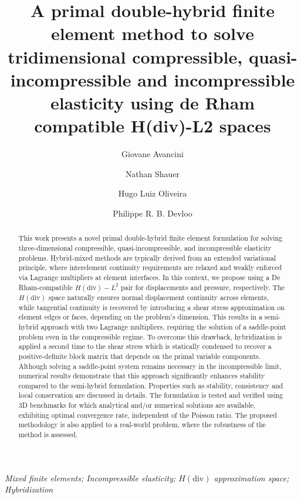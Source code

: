 \documentclass[english,11pt,3p,number,sort&compress]{elsarticle}
\begin{document}
\begin{frontmatter}{}

\title{A primal double-hybrid finite element method to solve tridimensional compressible, quasi-incompressible and incompressible elasticity using de Rham compatible H(div)-L2 spaces}

\author[uni]{Giovane Avancini}


\author[uni]{Nathan Shauer}


\author[uni]{Hugo Luiz Oliveira}


\author[uni]{Philippe R. B. Devloo}


\address[uni]{Universidade Estadual de Campinas, R. Josiah Willard Gibbs 85 - Cidade Universitaria, Campinas SP, Brazil, CEP 13083-839}

\begin{abstract}
	This work presents a novel primal double-hybrid finite element formulation for solving three-dimensional compressible, quasi-incompressible, and incompressible elasticity problems. Hybrid-mixed methods are typically derived from an extended variational principle, where interelement continuity requirements are relaxed and weakly enforced via Lagrange multipliers at element interfaces. In this context, we propose using a De Rham-compatible $H(\text{div})-L^2$ pair for displacements and pressure, respectively. The $H(\text{div})$ space naturally ensures normal displacement continuity across elements, while tangential continuity is recovered by introducing a shear stress approximation on element edges or faces, depending on the problem's dimension. This results in a semi-hybrid approach with two Lagrange multipliers, requiring the solution of a saddle-point problem even in the compressible regime. To overcome this drawback, hybridization is applied a second time to the shear stress which is statically condensed to recover a positive-definite block matrix that depends on the primal variable components. Although solving a saddle-point system remains necessary in the incompressible limit, numerical results demonstrate that this approach significantly enhances stability compared to the semi-hybrid formulation. Properties such as stability, consistency and local conservation are discussed in details. The formulation is tested and verified using 3D benchmarks for which analytical and/or numerical solutions are available, exhibiting optimal convergence rate, independent of the Poisson ratio. The proposed methodology is also applied to a real-world problem, where the robustness of the method is assessed.
\end{abstract}
\begin{keyword}
\textit{Mixed finite elements; Incompressible elasticity; $H\mathrm{(div)}$ approximation space; Hybridization}
\end{keyword}

\end{frontmatter}{}
\end{document}
